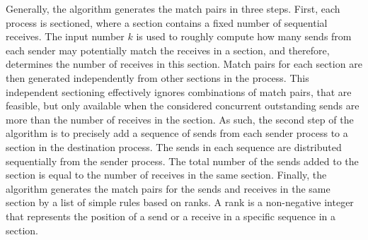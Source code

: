 Generally, the algorithm generates the match pairs in three steps. 
First, each process is sectioned, where a section contains a fixed number of sequential receives. The input number $k$ is used to roughly compute how many sends from each sender may potentially match the receives in a section, and therefore, determines the number of receives in this section. 
Match pairs for each section are then generated independently from other sections in the process. This independent sectioning effectively ignores combinations of match pairs, that are feasible, but only available when the considered concurrent outstanding sends are more than the number of receives in the section. As such, the second step of the algorithm is to precisely add a sequence of sends from each sender process to a section in the destination process. The sends in each sequence are distributed sequentially from the sender process. The total number of the sends added to the section is equal to the number of receives in the same section. Finally, the algorithm generates the match pairs for the sends and receives in the same section by a list of simple rules based on ranks. A rank is a non-negative integer that represents the position of a send or a receive in a specific sequence in a section.




